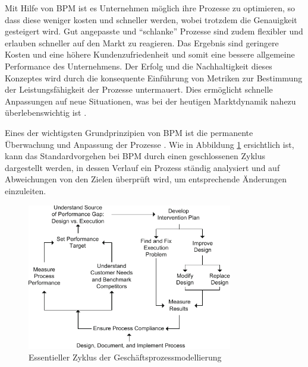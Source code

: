 \documentclass[a4paper,12pt]{report}
\begin{document}
Mit Hilfe von \ac{BPM} ist es Unternehmen möglich ihre Prozesse zu optimieren, so dass diese weniger kosten und schneller werden, wobei trotzdem die Genauigkeit gesteigert wird. Gut angepasste und "`schlanke"' Prozesse sind zudem flexibler und erlauben schneller auf den Markt zu reagieren. Das Ergebnis sind geringere Kosten und eine höhere Kundenzufriedenheit und somit eine bessere allgemeine Performance des Unternehmens. Der Erfolg und die Nachhaltigkeit dieses Konzeptes wird durch die konsequente Einführung von Metriken zur Bestimmung der Leistungsfähigkeit der Prozesse untermauert. Dies ermöglicht schnelle Anpassungen auf neue Situationen, was bei der heutigen Marktdynamik nahezu überlebenswichtig ist \citep[vgl.][S. 7]{Brocke2014}.

Eines der wichtigsten Grundprinzipien von \ac{BPM} ist die permanente Überwachung und Anpassung der Prozesse \citep[S. 11f.]{Brocke2014}. Wie in Abbildung \ref{process_management_cycle} ersichtlich ist, kann das Standardvorgehen bei \ac{BPM} durch einen geschlossenen Zyklus dargestellt werden, in dessen Verlauf ein Prozess ständig analysiert und auf Abweichungen von den Zielen überprüft wird, um entsprechende Änderungen einzuleiten.
\begin{figure}[ht]
\centering
\includegraphics[width=0.8\textwidth]{Images/process_management_cycle.pdf}
\caption[Essentieller Zyklus der Geschäftsprozessmodellierung]{Essentieller Zyklus der Geschäftsprozessmodellierung \citep[S. 5]{Brocke2014}}
\label{process_management_cycle}
\end{figure}
\end{document}
